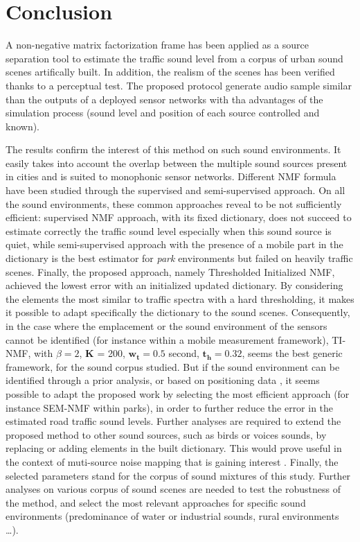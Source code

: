 \documentclass[review,5p,twocolumn,sort&compress,times]{elsarticle}
\begin{document}
\section{Conclusion}

A non-negative matrix factorization frame has been applied as a source separation tool to estimate the traffic sound level  from a corpus of urban sound scenes artifically built. In addition, the realism of the scenes has been verified thanks to a perceptual test. The proposed protocol generate audio sample similar than the outputs of a deployed sensor networks with tha advantages of the simulation process (sound level and position of each source controlled and known).

The results confirm the interest of this method on such sound environments. It easily takes into account the overlap between the multiple sound sources present in cities and is suited to monophonic sensor networks. Different NMF formula have been studied through the supervised and semi-supervised approach. On all the sound environments, these common approaches reveal to be not sufficiently efficient: supervised NMF approach, with its fixed dictionary, does not succeed to estimate correctly the traffic sound level especially when this sound source is quiet, while semi-supervised approach with the presence of a mobile part in the dictionary is the best estimator for \textit{park} environments but failed on heavily traffic scenes. Finally, the proposed approach, namely Thresholded Initialized NMF, achieved the lowest error with an initialized updated dictionary. By considering the elements the most similar to traffic spectra with a hard thresholding, it makes it possible to adapt specifically the dictionary to the sound scenes. Consequently, in the case where the emplacement or the sound environment of the sensors cannot be identified (for instance within a mobile measurement framework), TI-NMF, with $\beta = 2$, $\mathbf{K}$ = 200, $\mathbf{w_t} = 0.5$ second, $\mathbf{t_{h}} = 0.32$, seems the best generic framework, for the sound corpus studied. But if the sound environment can be identified through a prior analysis, or based on positioning data \cite{can2015noise,lavandier2016urban}, it seems possible to adapt the proposed work by selecting the most efficient approach (for instance SEM-NMF within parks), in order to further reduce the error in the estimated road traffic sound levels.
Further analyses are required to extend the proposed method to other sound sources, such as birds or voices sounds, by replacing or adding elements in the built dictionary. This would prove useful in the context of muti-source noise mapping that is  gaining interest \cite{aumond2017Probabilistic, aletta2015soundscape}. Finally, the selected parameters stand for the corpus of sound mixtures of this study. Further analyses on various corpus of sound scenes are needed to test the robustness of the method, and select the most relevant approaches for specific sound environments (predominance of water or industrial sounds, rural environments \dots).
\end{document}
